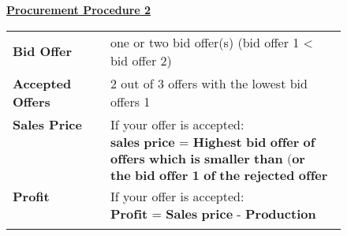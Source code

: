 \documentclass[11pt]{scrartcl}
\begin{document}
{\begin{figure}[ht!]
\begin{minipage}[t]{1\linewidth}
\begin{tcolorbox}[arc=0pt,colframe=black!25]
			\textbf{\underline{Procurement Procedure 2}} ~\bigbreak

				\begin{tabular}{ll} \medbreak
					\textbf{Bid Offer} 				& one or two bid offer(s) (bid offer 1 < bid offer 2) \\ \medbreak
					\textbf{Accepted Offers} 		& 2 out of 3 offers with the lowest bid offers 1 \\ \medbreak
					\textbf{Sales Price} 			&  If your offer is accepted: \\ 
													& \hspace{0.8cm} $ \textbf{sales price = Highest bid offer of the two accepted}$ \\
													& \hspace{3.4cm} $ \textbf{offers which is smaller than (or equals)} $  \\ 
													& \hspace{3.4cm} $ \textbf{the bid offer 1 of the rejected offer} $  \\ 
					\textbf{Profit}					& If your offer is accepted: \\ 
													& \hspace{0.8cm} $\textbf{Profit = Sales price - Production cost}$ \\
					\hspace{3.75cm}					& 	   
				\end{tabular} 
 
		\end{tcolorbox} 
	\end{minipage}  
  \end{figure}
 \clearpage
 \restoregeometry
}

~\newpage


\end{document}
